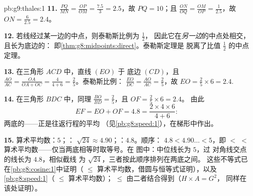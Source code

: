 \begin{solution}{pb:g9:thales:1}
\textbf{11.} $\frac{PQ}{MN} = \frac{OP}{OM} = \frac{7.5}{3}
= 2.5$，故 $PQ = 10$；且 $\frac{ON}{OQ} = \frac{OM}{OP} =
\frac{1}{2.5}$，故 $ON = \frac{6}{2.5} = 2.4$。

\textbf{12.} 若线经过某一边的中点，则泰勒斯比例为 $\frac12$，
因此它在\emph{另一边}的中点处相交，
且长为底边的：
即\cref{thm:g8:midpoints:direct}。泰勒斯定理是
脱离了比值 $\frac12$ 的中点定理。

\textbf{13.} 在三角形 $ACD$ 中，直线 $(EO)$ 于
底边 $(CD)$，且 $\frac{AO}{AC} = \frac{OA}{OA + OC} =
\frac{4}{4 + 6} = \frac25$。泰勒斯比例：
$\frac{EO}{DC} = \frac{AO}{AC} = \frac25$，故
$EO = \frac25 \times 6 = 2.4$.

\textbf{14.} 在三角形 $BDC$ 中，同理
$\frac{BO}{BD} = \frac25$，且 $OF = \frac25 \times 6 = 2.4$。
由此
\[
EF = EO + OF = 4.8
= \frac{2 \times 4 \times 6}{4 + 6} :
\]
两底的——正是往返行程的平均
（见\cref{pb:g8:speed:1}），在梯形中作出。

\textbf{15.} 算术平均数：$5$；：
$\sqrt{24} \approx 4.90$；：$4.8$。顺序：
$4.8 < 4.90\ldots < 5$，即 $<$  $<$
算术平均数——仅当两底相等时取等号。在
图中：中位线长为 $5$，过
对角线交点的线长为 $4.8$，相似截线
为 $\sqrt{24}$，三者按此顺序排列在两底之间。
这些不等式已在\cref{pb:g8:cosine:1}中证明（
$\leq$ 算术平均数，借圆与恒等式证明），以及
\cref{pb:g8:speed:1}（ $\leq$ 算术平均数）；
$\leq$ 由二者结合得到（$H \times A = G^2$，
同样在该处证明）。
\end{solution}
